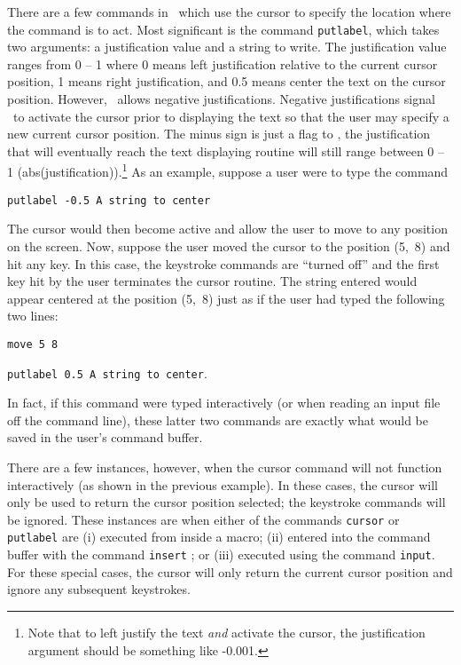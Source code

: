 There are a few commands in \wip\ which use the cursor to specify the
location where the command is to act.
Most significant is the command
{\tt putlabel},
which takes two arguments:
a justification value and a string to write.
The justification value ranges from 0 -- 1 where 0 means left
justification relative to the current cursor position, 1 means right
justification, and 0.5 means center the text on the cursor position.
However, \wip\ allows negative justifications.
Negative justifications signal \wip\ to
activate the cursor prior to displaying the text so that the user may
specify a new current cursor position.
The minus sign is just a flag to \wip, the justification that will
eventually reach the text displaying routine will still range
between 0 -- 1 (\ie abs(justification)).\footnote{Note that to
left justify the text {\em and} activate the cursor,
the justification argument should be something like -0.001.}
As an example, suppose a user were to type the command
\begin{wiplist}%
  \item[\wipp] {\tt putlabel -0.5 A string to center}
\end{wiplist}
The cursor would then become active and allow the user to move to any
position on the screen.
Now, suppose the user
moved the cursor to the position (5,~8) and hit any key.
In this case, the keystroke commands are ``turned off'' and the first
key hit by the user terminates the cursor routine.
The string entered would appear centered at the position (5,~8)
just as if the user had typed the following two lines:
\begin{wiplist}%
  \item {\tt move 5 8}
\samepage
  \item {\tt putlabel 0.5 A string to center}.
\end{wiplist}
In fact, if this command were typed interactively (or when reading an
input file off the command line),
these latter two commands are exactly what would be saved in
the user's command buffer.

There are a few instances, however, when the cursor command
will not function interactively (as shown in the previous example).
In these cases,
the cursor will only be used to return the cursor position selected;
the keystroke commands will be ignored.
These instances are when either of the
commands {\tt cursor}%
or
{\tt putlabel}%
%
are (i) executed from inside a macro;
(ii) entered into the command buffer with the
command {\tt insert}%
;
or (iii) executed using the
command {\tt input}.
For these special cases,
the cursor will only return the current cursor position
and ignore any subsequent keystrokes.
